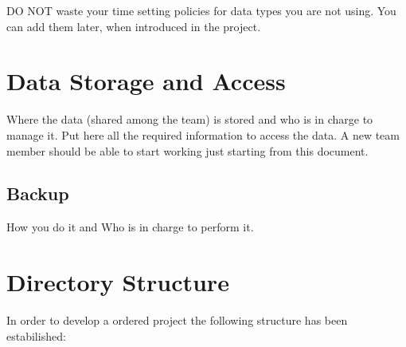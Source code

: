\documentclass[12pt]{article}
\begin{document}
DO NOT waste your time setting policies for data types you are not using. You can add them later, when introduced in the project.
\section{Data Storage and Access}
Where the data (shared among the team) is stored and who is in charge to manage it.
Put here all the required information to access the data. A new team member should be able to start working just starting from this document.
\subsection{Backup}
How you do it and Who is in charge to perform it.
\section{Directory Structure}
In order to develop a ordered project the following structure has been estabilished:
\end{document}
